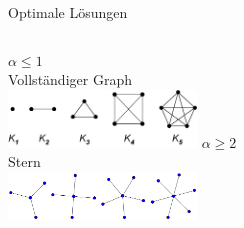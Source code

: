 \documentclass[mathserif, aspectratio=169]{beamer}
\begin{document}
\begin{frame}
{Optimale L\"osungen}
\begin{columns}
\textbf{$\alpha \leq 1$}\\
Vollst\"andiger Graph\\
\includegraphics[width=5cm]{pics/Complete_graph_example.png}
\textbf{$\alpha \geq 2$}\\
Stern\\
\includegraphics[width=5cm]{pics/star.png}
\end{columns}


\end{frame}
\end{document}
